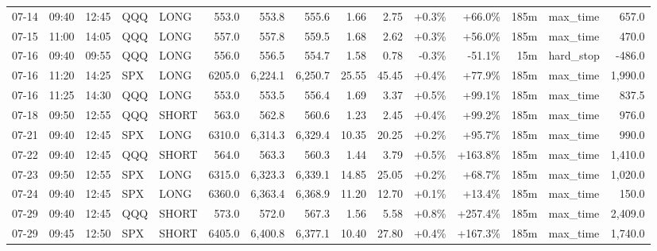 \documentclass[11pt,a4paper,twoside]{article}
\begin{document}
\begin{landscape}
\begin{center}
\begin{longtable}{>{\color{txtmain}}l l l l l r r r r r r r r >{\color{txtmain}}l r}
07-14 & 09:40 & 12:45 & QQQ & LONG & 553.0 & 553.8 & 555.6 & 1.66 & 2.75 & \textcolor{wingreen}{+0.3\%} & \textcolor{wingreen}{+66.0\%} & 185m & max\_time & \textcolor{wingreen}{657.0} \\
07-15 & 11:00 & 14:05 & QQQ & LONG & 557.0 & 557.8 & 559.5 & 1.68 & 2.62 & \textcolor{wingreen}{+0.3\%} & \textcolor{wingreen}{+56.0\%} & 185m & max\_time & \textcolor{wingreen}{470.0} \\
07-16 & 09:40 & 09:55 & QQQ & LONG & 556.0 & 556.5 & 554.7 & 1.58 & 0.78 & \textcolor{lossred}{-0.3\%} & \textcolor{lossred}{-51.1\%} & 15m & hard\_stop & \textcolor{lossred}{-486.0} \\
07-16 & 11:20 & 14:25 & SPX & LONG & 6205.0 & 6,224.1 & 6,250.7 & 25.55 & 45.45 & \textcolor{wingreen}{+0.4\%} & \textcolor{wingreen}{+77.9\%} & 185m & max\_time & \textcolor{wingreen}{1,990.0} \\
07-16 & 11:25 & 14:30 & QQQ & LONG & 553.0 & 553.5 & 556.4 & 1.69 & 3.37 & \textcolor{wingreen}{+0.5\%} & \textcolor{wingreen}{+99.1\%} & 185m & max\_time & \textcolor{wingreen}{837.5} \\
07-18 & 09:50 & 12:55 & QQQ & SHORT & 563.0 & 562.8 & 560.6 & 1.23 & 2.45 & \textcolor{wingreen}{+0.4\%} & \textcolor{wingreen}{+99.2\%} & 185m & max\_time & \textcolor{wingreen}{976.0} \\
07-21 & 09:40 & 12:45 & SPX & LONG & 6310.0 & 6,314.3 & 6,329.4 & 10.35 & 20.25 & \textcolor{wingreen}{+0.2\%} & \textcolor{wingreen}{+95.7\%} & 185m & max\_time & \textcolor{wingreen}{990.0} \\
07-22 & 09:40 & 12:45 & QQQ & SHORT & 564.0 & 563.3 & 560.3 & 1.44 & 3.79 & \textcolor{wingreen}{+0.5\%} & \textcolor{wingreen}{+163.8\%} & 185m & max\_time & \textcolor{wingreen}{1,410.0} \\
07-23 & 09:50 & 12:55 & SPX & LONG & 6315.0 & 6,323.3 & 6,339.1 & 14.85 & 25.05 & \textcolor{wingreen}{+0.2\%} & \textcolor{wingreen}{+68.7\%} & 185m & max\_time & \textcolor{wingreen}{1,020.0} \\
07-24 & 09:40 & 12:45 & SPX & LONG & 6360.0 & 6,363.4 & 6,368.9 & 11.20 & 12.70 & \textcolor{wingreen}{+0.1\%} & \textcolor{wingreen}{+13.4\%} & 185m & max\_time & \textcolor{wingreen}{150.0} \\
07-29 & 09:40 & 12:45 & QQQ & SHORT & 573.0 & 572.0 & 567.3 & 1.56 & 5.58 & \textcolor{wingreen}{+0.8\%} & \textcolor{wingreen}{+257.4\%} & 185m & max\_time & \textcolor{wingreen}{2,409.0} \\
07-29 & 09:45 & 12:50 & SPX & SHORT & 6405.0 & 6,400.8 & 6,377.1 & 10.40 & 27.80 & \textcolor{wingreen}{+0.4\%} & \textcolor{wingreen}{+167.3\%} & 185m & max\_time & \textcolor{wingreen}{1,740.0} \\

\end{longtable}
\end{center}
\end{landscape}
\end{document}
